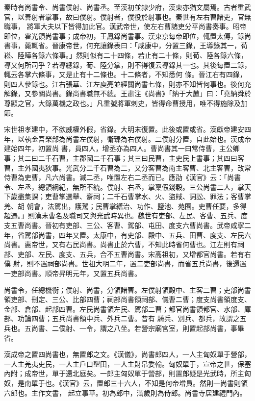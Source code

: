 \begin{pinyinscope}
 秦時有尚書令、尚書僕射、尚書丞。至漢初並隸少府，漢東亦猶文屬焉。古者重武官，以善射者掌事，故曰僕射。僕射者，僕役於射事也。秦世有左右曹諸吏，官無職事，
 將軍大夫以下皆得加此官。漢武帝世，使左右曹諸吏分平尚書奏事。昭帝即位，霍光領尚書事；成帝初，王鳳錄尚書事。漢東京每帝即位，輒置太傅，錄尚書事，薨輒省。晉康帝世，何充讓錄表曰：「咸康中，分置三錄，王導錄其一，荀崧、陸曄各錄六條事。」然則似有二十四條，若止有二十條，則荀、陸各錄六條，導又何所司乎？若導總錄，荀、陸分掌，則不得復云導錄其一也。其後每置二錄，輒云各掌六條事，又是止有十二條也。十二條者，不知悉何
 條。晉江右有四錄，則四人參錄也。江右張華、江左庾亮並經關尚書七條，則亦不知皆何事也。後何充解錄，又參關尚書。錄尚書職無不總。王肅注《尚書》「納于大麓」曰：「堯納舜於尊顯之官，大錄萬機之政也。」凡重號將軍刺史，皆得命曹授用，唯不得施除及加節。



 宋世祖孝建中，不欲威權外假，省錄。大明末復置。此後或置或省。漢獻帝建安四年，以執金吾榮郃為尚書左僕射，衛臻為右僕射。二僕射分置，自此始也。漢成帝建始四年，初置尚
 書，員四人，增丞亦為四人。曹尚書其一曰常侍曹，主公卿事；其二曰二千石曹，主郡國二千石事；其三曰民曹，主吏民上書事；其四曰客曹，主外國夷狄事。光武分二千石曹為二，又分客曹為南主客曹、北主客曹，改常侍曹為吏曹，凡六尚書。減二丞，唯置左右二丞而已。應劭《漢官》云：「尚書令、左丞，總領綱紀，無所不統。僕射、右丞，掌稟假錢穀。三公尚書二人，掌天下歲盡集課；吏曹掌選舉、齋祠；二千石曹掌水、火、盜賊、詞訟、罪法；客曹掌羌、胡
 朝會，法駕出，護駕；民曹掌繕治、功作、鹽池、苑囿。吏曹任要，多得超遷。」則漢末曹名及職司又與光武時異也。魏世有吏部、左民、客曹、五兵、度支五曹尚書。晉初有吏部、三公、客曹、駕部、屯田、度支六曹尚書。武帝咸寧二年，省駕部尚書，四年又置。太康中，有吏部、殿中、五兵、田曹、度支、左民六尚書。惠帝世，又有右民尚書。尚書止於六曹，不知此時省何曹也。江左則有祠部、吏部、左民、度支、五兵，合不五曹尚書。宋高祖初，又增都官尚書。若有右僕
 射，則不置祠部尚書。世祖大明二年，置二吏部尚書，而省五兵尚書，後還置一吏部尚書。順帝昇明元年，又置五兵尚書。



 尚書令，任總機衡；僕射、尚書，分領諸曹。左僕射領殿中、主客二曹；吏部尚書領吏部、刪定、三公、比部四曹；祠部尚書領祠部、儀曹二曹；度支尚書領度支、金部、倉部、起部四曹。左民尚書領左民、駕部二曹；都官尚書領都官、水部、庫部、功論四曹；五兵尚書領中兵、外兵二曹。昔有
 騎兵、別兵、都兵，故謂之五兵也。五尚書、二僕射、一令，謂之八坐。若營宗廟宮室，則置起部尚書，事畢省。



 漢成帝之置四尚書也，無置郎之文。《漢儀》，尚書郎四人，一人主匈奴單于營部，一人主羌夷吏民，一人主戶口墾田，一人主財帛委輸。匈奴單于，宣帝之世，保塞內附；成帝世，單于還北庭矣。一郎主匈奴單于營部，則置郎疑是光武時，所主匈奴，是南單于也。《漢官》云，置郎三十六人，不知是何帝增員。然則一尚書則領六郎也。主作文書，
 起立事草。初為郎中，滿歲則為侍郎。尚書寺居建禮門內。




\end{pinyinscope}
